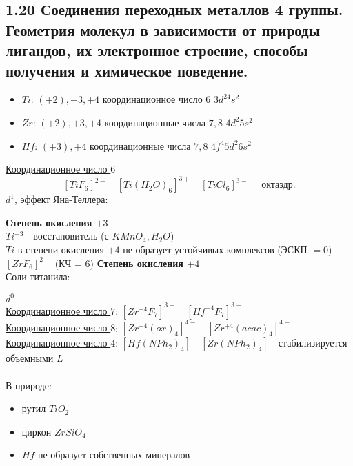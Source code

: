 
\subsection{1.20 Соединения переходных металлов 4 группы. Геометрия молекул в зависимости от природы лигандов, их электронное строение, способы получения и химическое поведение.}
\begin{itemize}
	\item $Ti$: $(+2), +3, +4$ \quad координационное число $6$ \quad $3d^24s^2$
	\item $Zr$: $(+2), +3, +4$ \quad координационные числа $7, 8$ \quad $4d^2 5s^2$
	\item $Hf$: $(+3), +4$ \quad координационные числа $7, 8$ \quad $4f^4 5d^2 6s^2$
\end{itemize}
\ul{Координационное число $6$}
\[
\left[TiF_6 \right]^{2-} \quad \left[Ti(H_2O)_6 \right]^{3+} \quad \left[TiCl_6 \right]^{3-} \quad \text{ октаэдр.}
\]
$d^1$, эффект Яна-Теллера:
\begin{figure} [H]
\end{figure}
\textbf{Степень окисления $+3$} \\
$Ti^{+3}$ - восстановитель (с $KMnO_4, H_2O$) \\
$Ti$ в степени окисления $+4$ не образует устойчивых комплексов (ЭСКП $= 0$) \\
$ \left[ZrF_6 \right]^{2-} $ (КЧ = $6$)
\textbf{Степень окисления $+4$} \\
Соли титанила:
\begin{figure} [H]
	\centering {\texttt{[image: aa1]}}
\end{figure}
$d^0$ \\
\ul{Координационное число $7$}: $ \left[Zr^{+4}F_7 \right]^{3-} \quad \left[Hf^{+4}F_7 \right]^{3-} $ \\
\ul{Координационное число $8$}: $ \left[Zr^{+4}(ox)_4 \right]^{4-} \quad \left[Zr^{+4}(acac)_4 \right]^{4-} $ \\
\ul{Координационное число $4$}: $ \left[Hf(NPh_2)_4 \right] \quad \left[Zr(NPh_2)_4 \right] $ - стабилизируется объемными $L$ \\ \\
В природе:
\begin{itemize}
	\item рутил $TiO_2$
	\item циркон $ZrSiO_4$
	\item $Hf$ не образует собственных минералов
\end{itemize}
